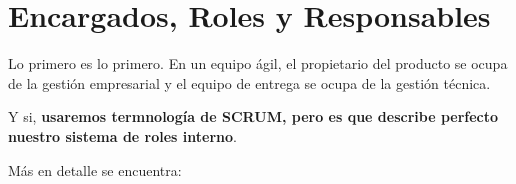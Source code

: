 \documentclass[12pt, fleqn]{report}                             %
\theoremstyle{break}                                            %
\begin{document}
    
    \clearpage
    \section{Encargados, Roles y Responsables}
    

        Lo primero es lo primero. En un equipo ágil, el propietario del producto se
        ocupa de la gestión empresarial y el equipo de entrega se ocupa de la gestión técnica.
        
        Y si, \textbf{usaremos termnología de SCRUM, pero es que describe perfecto nuestro
        sistema de roles interno}.
        
        Más en detalle se encuentra:
        
\end{document}
